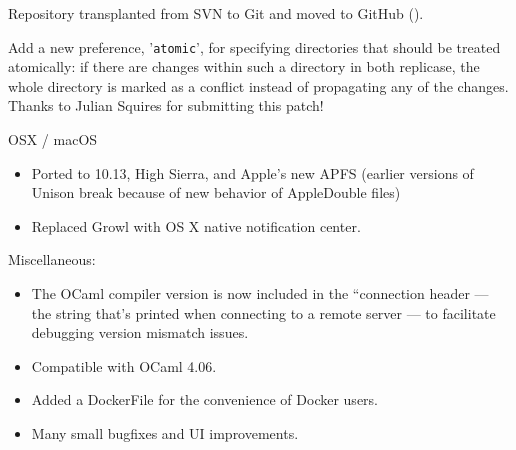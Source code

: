 \begin{changesfromversion}{2.48}
\item Repository transplanted from SVN to Git and moved to GitHub ().
\item Add a new preference, '{\tt atomic}', for specifying directories that
  should be treated atomically: if there are changes within such a
  directory in both replicase, the whole directory is marked as a
  conflict instead of propagating any of the changes.  Thanks to
  Julian Squires for submitting this patch!
\item OSX / macOS
  \begin{itemize}
    \item Ported to 10.13, High Sierra, and Apple's new APFS (earlier
    versions of Unison break because of new behavior of AppleDouble files)
    \item Replaced Growl with OS X native notification center.
\end{itemize}
\item Miscellaneous:
\begin{itemize}
\item The OCaml compiler version is now included in the ``connection header
--- the string that's printed when connecting to a remote server --- to
facilitate debugging version mismatch issues.  
\item Compatible with OCaml 4.06.
\item Added a DockerFile for the convenience of Docker users.
\item Many small bugfixes and UI improvements.
\end{itemize}
\end{changesfromversion}

